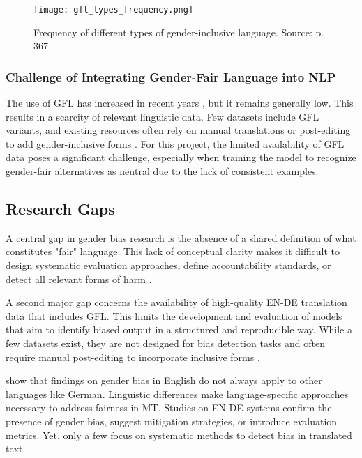     \begin{figure}
        \centering
            \texttt{[image: gfl\_types\_frequency.png]}
        \caption[Frequency of different types of gender-inclusive language]{Frequency of different types of gender-inclusive language. Source: \textcite{waldendorfWordsChangeIncrease2024} p. 367}
        \label{fig:gfl_types_frequency}
    \end{figure}

    \subsubsection{Challenge of Integrating Gender-Fair Language into NLP}
    The use of GFL has increased in recent years \parencite{waldendorfWordsChangeIncrease2024}, but it remains generally low. This results in a scarcity of relevant linguistic data. Few datasets include GFL variants, and existing resources often rely on manual translations or post-editing to add gender-inclusive forms \parencite{lardelliBuildingBridgesDataset2024}. For this project, the limited availability of GFL data poses a significant challenge, especially when training the model to recognize gender-fair alternatives as neutral due to the lack of consistent examples.


    \subsection{Research Gaps}
    A central gap in gender bias research is the absence of a shared definition of what constitutes "fair" language. This lack of conceptual clarity makes it difficult to design systematic evaluation approaches, define accountability standards, or detect all relevant forms of harm \parencite{barclayInvestigatingMarkersDrivers2024a,shresthaExploringGenderBiases2022,stanczakSurveyGenderBias2021}.

    A second major gap concerns the availability of high-quality EN-DE translation data that includes GFL. This limits the development and evaluation of models that aim to identify biased output in a structured and reproducible way. While a few datasets exist, they are not designed for bias detection tasks and often require manual post-editing to incorporate inclusive forms \parencite{lardelliBuildingBridgesDataset2024}.

    \textcite{stanczakSurveyGenderBias2021} show that findings on gender bias in English do not always apply to other languages like German. Linguistic differences make language-specific approaches necessary to address fairness in MT. Studies on EN-DE systems \parencite{ullmannGenderBiasMachine2022,kapplAreAllSpanish2025,lardelliBuildingBridgesDataset2024} confirm the presence of gender bias, suggest mitigation strategies, or introduce evaluation metrics. Yet, only a few focus on systematic methods to detect bias in translated text.

